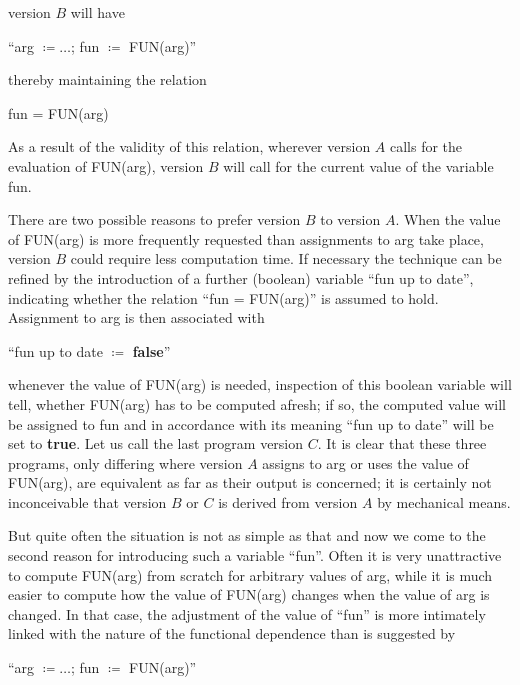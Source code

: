 \noindent
version $B$ will have
\medskip

{
	\setlength{\parindent}{8em}
	\hspace{-.5em}``arg $\coloneq \dots$; fun $\coloneq$ FUN(arg)''
	
}
\medskip

\noindent
thereby maintaining the relation
\medskip

{
	\setlength{\parindent}{8em}
	fun = FUN(arg)
}
\medskip

\noindent
As a result of the validity of this relation, wherever version $A$ calls for the evaluation of FUN(arg), version $B$ will call for the current value of the variable fun.

There are two possible reasons to prefer version $B$ to version $A$. When the value of FUN(arg) is more frequently requested than assignments to arg take place, version $B$ could require less computation time. If necessary the technique can be refined by the introduction of a further (boolean) variable ``fun up to date'', indicating whether the relation ``fun = FUN(arg)'' is assumed to hold. Assignment to arg is then associated with
\medskip

{
	\setlength{\parindent}{8em}
	\hspace{-.5em}``fun up to date $\coloneq$ \textbf{false}''
}
\medskip

\noindent
whenever the value of FUN(arg) is needed, inspection of this boolean variable will tell, whether FUN(arg) has to be computed afresh; if so, the computed value will be assigned to fun and in accordance with its meaning ``fun up to date'' will be set to \textbf{true}. Let us call the last program version $C$. It is clear that these three programs, only differing where version $A$ assigns to arg or uses the value of FUN(arg), are equivalent as far as their output is concerned; it is certainly not inconceivable that version $B$ or $C$ is derived from version $A$ by mechanical means.

But quite often the situation is not as simple as that and now we come to the second reason for introducing such a variable ``fun''. Often it is very unattractive to compute FUN(arg) from scratch for arbitrary values of arg, while it is much easier to compute how the value of FUN(arg) changes when the value of arg is changed. In that case, the adjustment of the value of ``fun'' is more intimately linked with the nature of the functional dependence than is suggested by
\medskip

{
	\setlength{\parindent}{8em}
	\hspace{-.5em}``arg $\coloneq\dots$; fun $\coloneq$ FUN(arg)''
}
\medskip

